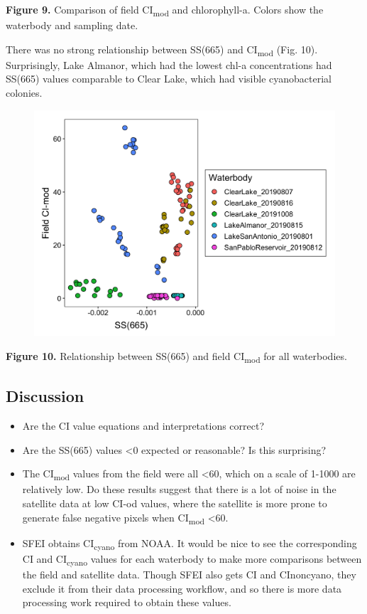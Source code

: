 \documentclass[
]{article}
\begin{document}
\textbf{Figure 9.} Comparison of field CI\textsubscript{mod} and
chlorophyll-a. Colors show the waterbody and sampling date.

There was no strong relationship between SS(665) and
CI\textsubscript{mod} (Fig. 10). Surprisingly, Lake Almanor, which had
the lowest chl-a concentrations had SS(665) values comparable to Clear
Lake, which had visible cyanobacterial colonies.

\begin{figure}

{\centering \includegraphics[width=0.6\linewidth]{../Data/Figures_output/ss665_CImod} 

}

\end{figure}

\textbf{Figure 10.} Relationship between SS(665) and field
CI\textsubscript{mod} for all waterbodies.

\hypertarget{discussion}{%
\subsection{\texorpdfstring{\textbf{Discussion}}{Discussion}}\label{discussion}}

\begin{itemize}
\item
  Are the CI value equations and interpretations correct?
\item
  Are the SS(665) values \textless0 expected or reasonable? Is this
  surprising?
\item
  The CI\textsubscript{mod} values from the field were all \textless60,
  which on a scale of 1-1000 are relatively low. Do these results
  suggest that there is a lot of noise in the satellite data at low
  CI-od values, where the satellite is more prone to generate false
  negative pixels when CI\textsubscript{mod} \textless60.
\item
  SFEI obtains CI\textsubscript{cyano} from NOAA. It would be nice to
  see the corresponding CI and CI\textsubscript{cyano} values for each
  waterbody to make more comparisons between the field and satellite
  data. Though SFEI also gets CI and CInoncyano, they exclude it from
  their data processing workflow, and so there is more data processing
  work required to obtain these values.
\end{itemize}
\end{document}
